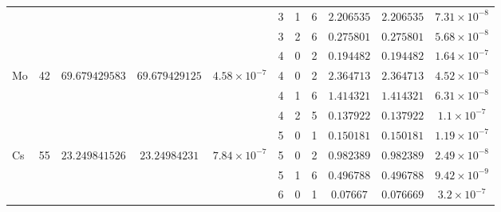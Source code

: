 \begin{table}[!htbp]
\begin{tabular}{@{}l c ccc ccc ccc@{}}
         &  &  &  &  & 3 & 1 & 6 & $2.206535$ & $2.206535$ & $7.31 \times 10^{-8}$ \\
         &  &  &  &  & 3 & 2 & 6 & $0.275801$ & $0.275801$ & $5.68 \times 10^{-8}$ \\
         &  &  &  &  & 4 & 0 & 2 & $0.194482$ & $0.194482$ & $1.64 \times 10^{-7}$ \\
        \multirow[t]{4}{*}{Mo} & \multirow[t]{4}{*}{42} & \multirow[t]{4}{*}{$69.679429583$} & \multirow[t]{4}{*}{$69.679429125$} & \multirow[t]{4}{*}{$4.58 \times 10^{-7}$} & 4 & 0 & 2 & $2.364713$ & $2.364713$ & $4.52 \times 10^{-8}$ \\
         &  &  &  &  & 4 & 1 & 6 & $1.414321$ & $1.414321$ & $6.31 \times 10^{-8}$ \\
         &  &  &  &  & 4 & 2 & 5 & $0.137922$ & $0.137922$ & $1.1 \times 10^{-7}$ \\
         &  &  &  &  & 5 & 0 & 1 & $0.150181$ & $0.150181$ & $1.19 \times 10^{-7}$ \\
        \multirow[t]{3}{*}{Cs} & \multirow[t]{3}{*}{55} & \multirow[t]{3}{*}{$23.249841526$} & \multirow[t]{3}{*}{$23.24984231$} & \multirow[t]{3}{*}{$7.84 \times 10^{-7}$} & 5 & 0 & 2 & $0.982389$ & $0.982389$ & $2.49 \times 10^{-8}$ \\
         &  &  &  &  & 5 & 1 & 6 & $0.496788$ & $0.496788$ & $9.42 \times 10^{-9}$ \\
         &  &  &  &  & 6 & 0 & 1 & $0.07667$ & $0.076669$ & $3.2 \times 10^{-7}$ \\
        \bottomrule
    \end{tabular}
\end{table}

